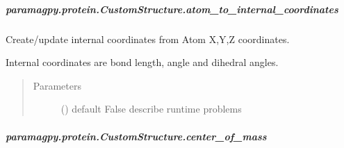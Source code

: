 \documentclass[a4paper,10pt,english,openany,oneside]{sphinxmanual}
\begin{document}
\begin{fulllineitems}
\begin{fulllineitems}
\begin{fulllineitems}
\end{fulllineitems}



\subparagraph{paramagpy.protein.CustomStructure.atom\_to\_internal\_coordinates}
\label{\detokenize{reference/generated/paramagpy.protein.CustomStructure.atom_to_internal_coordinates:paramagpy-protein-customstructure-atom-to-internal-coordinates}}\label{\detokenize{reference/generated/paramagpy.protein.CustomStructure.atom_to_internal_coordinates::doc}}

\begin{fulllineitems}
\label{\detokenize{reference/generated/paramagpy.protein.CustomStructure.atom_to_internal_coordinates:paramagpy.protein.CustomStructure.atom_to_internal_coordinates}}
\sphinxAtStartPar
Create/update internal coordinates from Atom X,Y,Z coordinates.

\sphinxAtStartPar
Internal coordinates are bond length, angle and dihedral angles.
\begin{quote}\begin{description}
\item[{Parameters}] \leavevmode
\sphinxAtStartPar
{} () \textendash{} default False
describe runtime problems

\end{description}\end{quote}

\end{fulllineitems}



\subparagraph{paramagpy.protein.CustomStructure.center\_of\_mass}
\label{\detokenize{reference/generated/paramagpy.protein.CustomStructure.center_of_mass:paramagpy-protein-customstructure-center-of-mass}}\label{\detokenize{reference/generated/paramagpy.protein.CustomStructure.center_of_mass::doc}}


\end{fulllineitems}
\end{fulllineitems}
\end{document}
